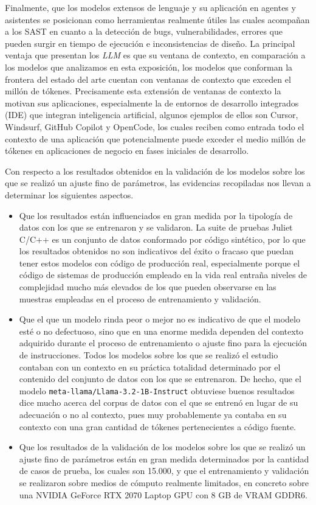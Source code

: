 \documentclass[12pt, a4paper, twoside]{article}
\begin{document}
Finalmente, que los modelos extensos de lenguaje y su aplicación en agentes y asistentes se posicionan como herramientas realmente útiles las cuales acompañan a los SAST en cuanto a la detección de bugs, vulnerabilidades, errores que pueden surgir en tiempo de ejecución e inconsistencias de diseño. La principal ventaja que presentan los \textit{LLM} es que su ventana de contexto, en comparación a los modelos que analizamos en esta exposición, los modelos que conforman la frontera del estado del arte cuentan con ventanas de contexto que exceden el millón de tókenes. Precisamente esta extensión de ventanas de contexto la motivan sus aplicaciones, especialmente la de entornos de desarrollo integrados (IDE) que integran inteligencia artificial, algunos ejemplos de ellos son Cursor, Windsurf, GitHub Copilot y OpenCode, los cuales reciben como entrada todo el contexto de una aplicación que potencialmente puede exceder el medio millón de tókenes en aplicaciones de negocio en fases iniciales de desarrollo.

Con respecto a los resultados obtenidos en la validación de los modelos sobre los que se realizó un ajuste fino de parámetros, las evidencias recopiladas nos llevan a determinar los siguientes aspectos.
\begin{itemize}
	\item Que los resultados están influenciados en gran medida por la tipología de datos con los que se entrenaron y se validaron. La suite de pruebas Juliet C/C++ es un conjunto de datos conformado por código sintético, por lo que los resultados obtenidos no son indicativos del éxito o fracaso que puedan tener estos modelos con código de producción real, especialmente porque el código de sistemas de producción empleado en la vida real entraña niveles de complejidad mucho más elevados de los que pueden observarse en las muestras empleadas en el proceso de entrenamiento y validación.
	
	\item Que el que un modelo rinda peor o mejor no es indicativo de que el modelo esté o no defectuoso, sino que en una enorme medida dependen del contexto adquirido durante el proceso de entrenamiento o ajuste fino para la ejecución de instrucciones. Todos los modelos sobre los que se realizó el estudio contaban con un contexto en su práctica totalidad determinado por el contenido del conjunto de datos con los que se entrenaron. De hecho, que el modelo \texttt{meta-llama/Llama-3.2-1B-Instruct} obtuviese buenos resultados dice mucho acerca del corpus de datos con el que se entrenó en lugar de su adecuación o no al contexto, pues muy probablemente ya contaba en su contexto con una gran cantidad de tókenes pertenecientes a código fuente.
	
	\item Que los resultados de la validación de los modelos sobre los que se realizó un ajuste fino de parámetros están en gran medida determinados por la cantidad de casos de prueba, los cuales son 15.000, y que el entrenamiento y validación se realizaron sobre medios de cómputo realmente limitados, en concreto sobre una NVIDIA GeForce RTX 2070 Laptop GPU con 8 GB de VRAM GDDR6. 
\end{itemize}
\end{document}
